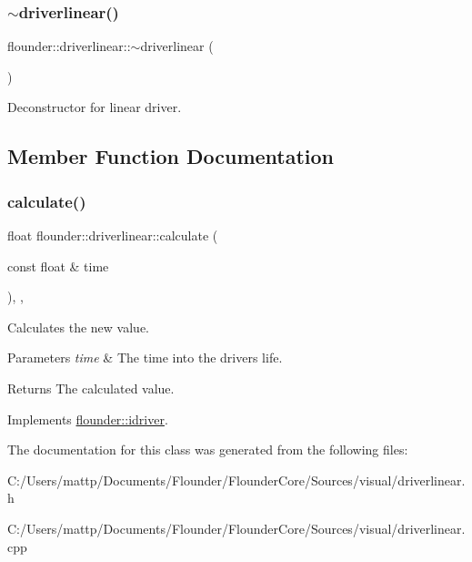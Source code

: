 \subsubsection{\texorpdfstring{$\sim$driverlinear()}{~driverlinear()}}
{\footnotesize\ttfamily flounder\+::driverlinear\+::$\sim$driverlinear (\begin{DoxyParamCaption}{ }\end{DoxyParamCaption})}



Deconstructor for linear driver. 



\subsection{Member Function Documentation}
\mbox{\label{classflounder_1_1driverlinear_a7f645c05d7a8bdb555bbf70aca7c630e}} 
\subsubsection{\texorpdfstring{calculate()}{calculate()}}
{\footnotesize\ttfamily float flounder\+::driverlinear\+::calculate (\begin{DoxyParamCaption}\item[{const float \&}]{time }\end{DoxyParamCaption})\hspace{0.3cm}{\ttfamily [override]}, {\ttfamily [protected]}, {\ttfamily [virtual]}}



Calculates the new value. 


\begin{DoxyParams}{Parameters}
{\em time} & The time into the drivers life. \\
\hline
\end{DoxyParams}
\begin{DoxyReturn}{Returns}
The calculated value. 
\end{DoxyReturn}


Implements \hyperlink{classflounder_1_1idriver_a034c4159dc98c4c37ffdfaae64e4a16d}{flounder\+::idriver}.



The documentation for this class was generated from the following files\+:\begin{DoxyCompactItemize}
\item 
C\+:/\+Users/mattp/\+Documents/\+Flounder/\+Flounder\+Core/\+Sources/visual/driverlinear.\+h\item 
C\+:/\+Users/mattp/\+Documents/\+Flounder/\+Flounder\+Core/\+Sources/visual/driverlinear.\+cpp\end{DoxyCompactItemize}
